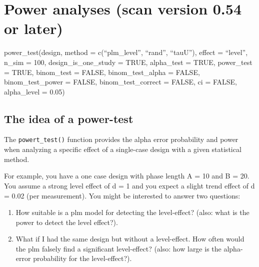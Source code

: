 \documentclass[
  letterpaper,
  DIV=11,
  numbers=noendperiod]{scrreprt}
\providecommand{\tightlist}{%
  \setlength{\itemsep}{0pt}\setlength{\parskip}{0pt}}\usepackage{longtable,booktabs,array}
\begin{document}
\hypertarget{power-analyses-scan-version-0.54-or-later}{%
\chapter{Power analyses (scan version 0.54 or
later)}\label{power-analyses-scan-version-0.54-or-later}}

\begin{tcolorbox}[enhanced jigsaw, toprule=.15mm, colframe=quarto-callout-tip-color-frame, left=2mm, colback=white, breakable, bottomrule=.15mm, arc=.35mm, rightrule=.15mm, leftrule=.75mm, opacityback=0]
\begin{minipage}[t]{5.5mm}
\textcolor{quarto-callout-tip-color}{\faLightbulb}
\end{minipage}%
\begin{minipage}[t]{\textwidth - 5.5mm}
power\_test(design, method = c(``plm\_level'', ``rand'', ``tauU''),
effect = ``level'', n\_sim = 100, design\_is\_one\_study = TRUE,
alpha\_test = TRUE, power\_test = TRUE, binom\_test = FALSE,
binom\_test\_alpha = FALSE, binom\_test\_power = FALSE,
binom\_test\_correct = FALSE, ci = FALSE, alpha\_level =
0.05)\end{minipage}%
\end{tcolorbox}

\hypertarget{the-idea-of-a-power-test}{%
\section{The idea of a power-test}\label{the-idea-of-a-power-test}}

The \texttt{powert\_test()} function provides the alpha error
probability and power when analyzing a specific effect of a single-case
design with a given statistical method.

For example, you have a one case design with phase length A = 10 and B =
20. You assume a strong level effect of d = 1 and you expect a slight
trend effect of d = 0.02 (per measurement). You might be interested to
answer two questions:

\begin{enumerate}
\def\labelenumi{\arabic{enumi}.}
\tightlist
\item
  How suitable is a plm model for detecting the level-effect? (also:
  what is the power to detect the level effect?).
\item
  What if I had the same design but without a level-effect. How often
  would the plm falsely find a significant level-effect? (also: how
  large is the alpha-error probability for the level-effect?).
\end{enumerate}
\end{document}
